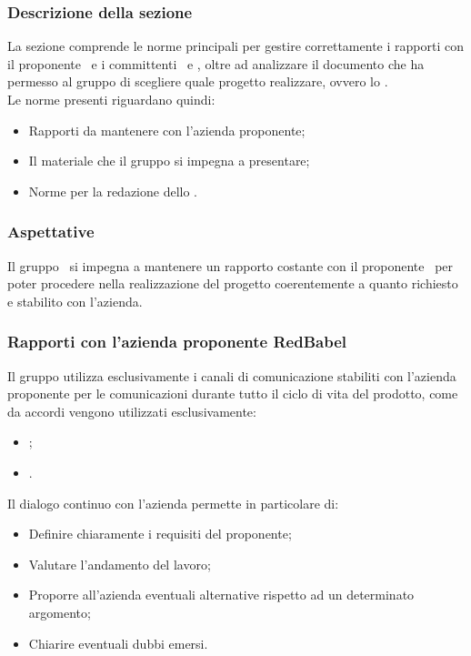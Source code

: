 \subsubsection{Descrizione della sezione} 
La sezione comprende le norme principali per gestire correttamente i rapporti con il proponente \Proponente\ e i committenti \VT\ e \CR, oltre ad analizzare il documento che ha permesso al gruppo di scegliere quale progetto realizzare, ovvero lo \SdF{}.\\
Le norme presenti riguardano quindi:
\begin{itemize}
	\item Rapporti da mantenere con l'azienda proponente;
	\item Il materiale che il gruppo si impegna a presentare;
	\item Norme per la redazione  dello \SdF{}.
\end{itemize}

\subsubsection{Aspettative}
Il gruppo \Gruppo\ si impegna a mantenere un rapporto costante con il proponente \Proponente\ per poter procedere nella realizzazione del progetto coerentemente a quanto richiesto e stabilito con l'azienda.

\subsubsection{Rapporti con l'azienda proponente RedBabel}\label{Rapporti RedBabel}
Il gruppo utilizza esclusivamente i canali di comunicazione stabiliti con l'azienda proponente per le comunicazioni durante tutto il ciclo di vita del prodotto, come da accordi vengono utilizzati esclusivamente:
\begin{itemize}
	\item {};
	\item {}.
\end{itemize}
Il dialogo continuo con l'azienda permette in particolare di:
\begin{itemize}
	\item Definire chiaramente i requisiti del proponente;
	\item Valutare l'andamento del lavoro;
	\item Proporre all'azienda eventuali alternative rispetto ad un determinato argomento;
	\item Chiarire eventuali dubbi emersi.
\end{itemize}

